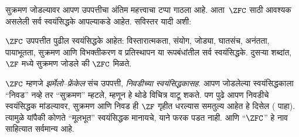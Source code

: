 \documentclass[../../../include/open-logic-section]{subfiles}
\begin{document}

सुक्रमण जोडल्यावर आपण उपपत्तीचा अंतिम महत्त्वाचा टप्पा गाठला आहे. आता~$\ZFC$ साठी आवश्यक असलेली सर्व स्वयंसिद्धके आपल्याकडे आहेत. सविस्तर यादी अशी:

\begin{defn}
$\ZFC$ उपपत्तीत पुढील स्वयंसिद्धके आहेत: विस्तारात्मकता, संयोग, जोड्या, घातसंच, अनंतता, पायाभूतता, सुक्रमण आणि विभक्तीकरण व प्रतिस्थापन या रूपबंधांतील सर्व स्वयंसिद्धके. दुसऱ्या शब्दांत, $\ZF$ मध्ये सुक्रमण जोडले की $\ZFC$ मिळते.
\end{defn}

$\ZFC$ म्हणजे \emph{झर्मेलो--फ्रेंकेल} संच उपपत्ती, \emph{निवडीच्या स्वयंसिद्धकासह}. आपण जोडलेल्या स्वयंसिद्धकाला “निवड” नव्हे तर “सुक्रमण” म्हटले, म्हणून हे थोडे विचित्र वाटू शकते. पण पुढे आपण {निवडीचे स्वयंसिद्धक} मांडल्यावर, सुक्रमण आणि निवड ही $\ZF$ गृहीत धरल्यास समतुल्य आहेत हे दिसेल ( पाहा). त्यामुळे यांपैकी कोणते “मूलभूत” स्वयंसिद्धक मानायचे, याने फरक पडत नाही. आणि “$\ZFC$” हे नाव साहित्यात सर्वमान्य आहे.
\end{document}
